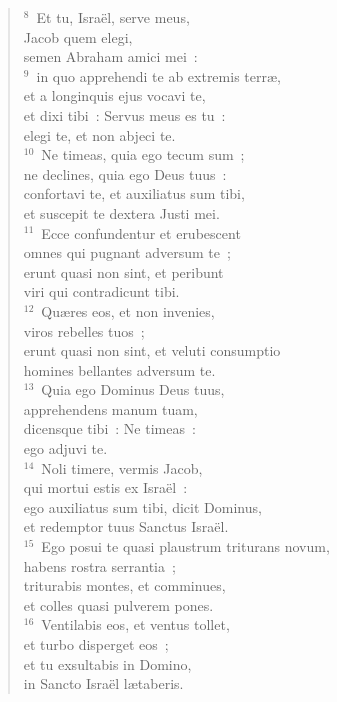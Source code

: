 \begin{flushleft}\begin{verse}${}^{8}$~Et tu, Isra\"el, serve meus,\\ Jacob quem elegi,\\ semen Abraham amici mei~:\\
${}^{9}$~in quo apprehendi te ab extremis terr\ae ,\\ et a longinquis ejus vocavi te,\\ et dixi tibi~: Servus meus es tu~:\\ elegi te, et non abjeci te.\\
${}^{10}$~Ne timeas, quia ego tecum sum~;\\ ne declines, quia ego Deus tuus~:\\ confortavi te, et auxiliatus sum tibi,\\ et suscepit te dextera Justi mei.\\
${}^{11}$~Ecce confundentur et erubescent\\ omnes qui pugnant adversum te~;\\ erunt quasi non sint, et peribunt\\ viri qui contradicunt tibi.\\
${}^{12}$~Qu\ae res eos, et non invenies,\\ viros rebelles tuos~;\\ erunt quasi non sint, et veluti consumptio\\ homines bellantes adversum te.\\
${}^{13}$~Quia ego Dominus Deus tuus,\\ apprehendens manum tuam,\\ dicensque tibi~: Ne timeas~:\\ ego adjuvi te.\\
${}^{14}$~Noli timere, vermis Jacob,\\ qui mortui estis ex Isra\"el~:\\ ego auxiliatus sum tibi, dicit Dominus,\\ et redemptor tuus Sanctus Isra\"el.\\
${}^{15}$~Ego posui te quasi plaustrum triturans novum,\\ habens rostra serrantia~;\\ triturabis montes, et comminues,\\ et colles quasi pulverem pones.\\
${}^{16}$~Ventilabis eos, et ventus tollet,\\ et turbo disperget eos~;\\ et tu exsultabis in Domino,\\ in Sancto Isra\"el l\ae taberis.\\

\end{verse}
\end{flushleft}
